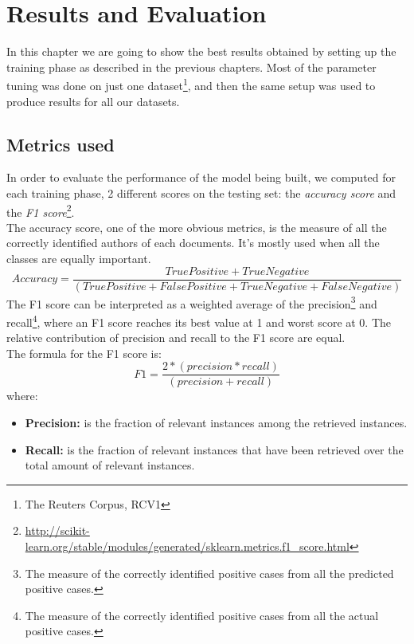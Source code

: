 \chapter{Results and Evaluation}
In this chapter we are going to show the best results obtained by setting up the training phase as described in the previous chapters. Most of the parameter tuning was done on just one dataset\footnote{The Reuters Corpus, RCV1}, and then the same setup was used to produce results for all our datasets.

\section{Metrics used}
In order to evaluate the performance of the model being built, we computed for each training phase, 2 different scores on the testing set: the \textit{accuracy score} and the \textit{F1 score}\footnote{\url{http://scikit-learn.org/stable/modules/generated/sklearn.metrics.f1_score.html}}.\\ 
The accuracy score, one of the more obvious metrics, is the measure of all the correctly identified authors of each documents. It's mostly used when all the classes are equally important.
\begin{equation}
Accuracy = \frac{True Positive + True Negative}{(True Positive + False Positive + True Negative + False Negative)}
\end{equation}
The F1 score can be interpreted as a weighted average of the precision\footnote{The measure of the correctly identified positive cases from all the predicted positive cases.} and recall\footnote{The measure of the correctly identified positive cases from all the actual positive cases.}, where an F1 score reaches its best value at 1 and worst score at 0. The relative contribution of precision and recall to the F1 score are equal.\\The formula for the F1 score is:\\
\begin{equation}
F1 = \frac{2 * (precision * recall)}{(precision + recall)}
\end{equation}
where:
\begin{itemize}
	\item \textbf{Precision:} is the fraction of relevant instances among the retrieved instances.
	\item \textbf{Recall:} is the fraction of relevant instances that have been retrieved over the total amount of relevant instances.
\end{itemize}

